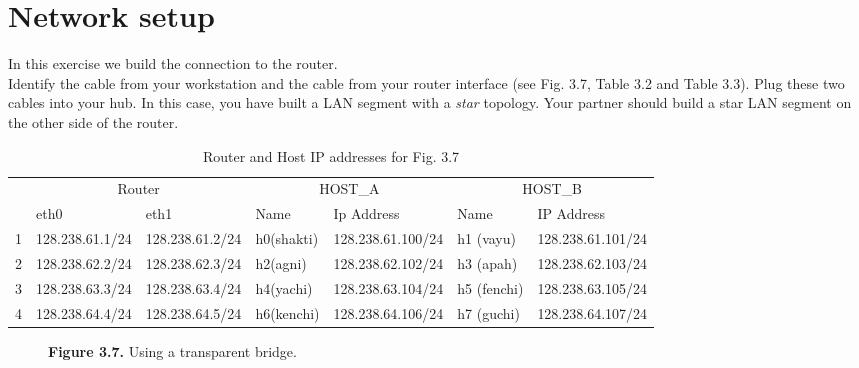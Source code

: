 \documentclass[10pt,a4paper]{article}
\numberwithin{equation}{section}
\numberwithin{figure}{section}
\numberwithin{table}{section}
\begin{document}
\section{Network setup}
    In this exercise we build the connection to the router. \\
    Identify the cable from your workstation and the cable from your router interface (see Fig. 3.7, Table 3.2 and Table 3.3).
    Plug these two cables into your hub.
    In this case, you have built a LAN segment with a \textit{star} topology.
    Your partner should build a star LAN segment on the other side of the router. \\
    \begin{table}[H]
        \caption{Router and Host IP addresses for Fig. 3.7}
        \vspace{5pt}
        \centering
        \large
        \begin{tabular}{ *7l }
            \hline \hline
                & \multicolumn{2}{c}{Router} & \multicolumn{2}{c}{HOST\_A} & \multicolumn{2}{c}{HOST\_B} \\
            & eth0 & eth1 & Name & Ip Address & Name & IP Address \\
            \hline 
            1 & 128.238.61.1/24 & 128.238.61.2/24 & h0(shakti) & 128.238.61.100/24 & h1 (vayu) & 128.238.61.101/24 \\
            2 & 128.238.62.2/24 & 128.238.62.3/24 & h2(agni) & 128.238.62.102/24 & h3 (apah) & 128.238.62.103/24 \\
            3 & 128.238.63.3/24 & 128.238.63.4/24 & h4(yachi) & 128.238.63.104/24 & h5 (fenchi) & 128.238.63.105/24 \\
            4 & 128.238.64.4/24 & 128.238.64.5/24 & h6(kenchi) & 128.238.64.106/24 & h7 (guchi) & 128.238.64.107/24 \\
            \hline \hline
            \end{tabular}
    \end{table}

    \begin{figure}[H]
        \centering
        \caption{\textbf{Figure 3.7.} Using a transparent bridge.}        
    \end{figure}
\end{document}
